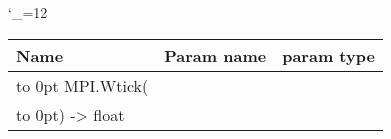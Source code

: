 \begingroup \catcode`\_=12 \tt
\begin{tabular}{lll}
\toprule
\textrm{Name}&\textrm{Param name}&\textrm{param type}\\
\midrule
\hbox to 0pt {MPI.Wtick(\hss}\\
\hbox to 0pt{) -> float\hss}\\
\bottomrule
\end{tabular}
\endgroup
